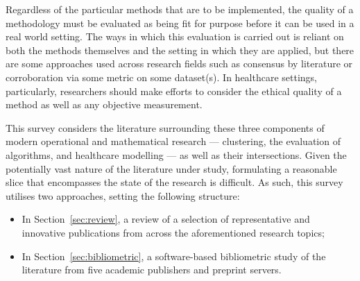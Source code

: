 Regardless of the particular methods that are to be implemented, the quality of
a methodology must be evaluated as being fit for purpose before it can be used
in a real world setting. The ways in which this evaluation is carried out is
reliant on both the methods themselves and the setting in which they are
applied, but there are some approaches used across research fields such as
consensus by literature or corroboration via some metric on some dataset(s). In
healthcare settings, particularly, researchers should make efforts to consider
the ethical quality of a method as well as any objective measurement.

This survey considers the literature surrounding these three components of
modern operational and mathematical research --- clustering, the evaluation of
algorithms, and healthcare modelling --- as well as their intersections. Given
the potentially vast nature of the literature under study, formulating a
reasonable slice that encompasses the state of the research is difficult. As
such, this survey utilises two approaches, setting the following structure:

\begin{itemize}
    \item In Section~\ref{sec:review}, a review of a selection of representative
        and innovative publications from across the aforementioned research
        topics;
    \item In Section~\ref{sec:bibliometric}, a software-based bibliometric study
        of the literature from five academic publishers and preprint servers.
\end{itemize}
